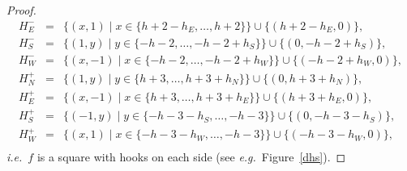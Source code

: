 \documentclass[final,nomarks]{dmtcs-episciences}
\begin{document}
\begin{proof}
\begin{eqnarray*}
	H_E^-&=&\{(x,1)\mid x\in\{h+2-h_E,\ldots,h+2\}\}\cup\{(h+2-h_E,0)\},\\
	H_S^-&=&\{(1,y)\mid y\in\{-h-2,\ldots,-h-2+h_S\}\}\cup\{(0,-h-2+h_S)\},\\
	H_W^-&=&\{(x,-1)\mid x\in\{-h-2,\ldots,-h-2+h_W\}\}\cup\{(-h-2+h_W,0)\},\\
H_N^+&=&\{(1,y)\mid y\in\{h+3,\ldots,h+3+h_N\}\}\cup\{(0,h+3+h_N)\},\\
	H_E^+&=&\{(x,-1)\mid x\in\{h+3,\ldots,h+3+h_E\}\}\cup\{(h+3+h_E,0)\},\\
	H_S^+&=&\{(-1,y)\mid y\in\{-h-3-h_S,\ldots,-h-3\}\}\cup\{(0,-h-3-h_S)\},\\
	H_W^+&=&\{(x,1)\mid x\in\{-h-3-h_W,\ldots,-h-3\}\}\cup\{(-h-3-h_W,0)\},\\
\end{eqnarray*}
\textit{i.e.}\ $f$ is a square with hooks on each side (see
\textit{e.g.}\ Figure~\ref{dhs}).


\end{proof}
\end{document}

